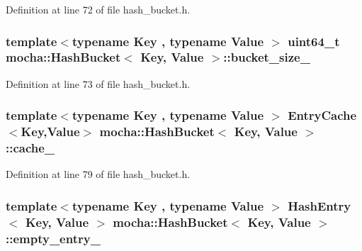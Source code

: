 Definition at line 72 of file hash\_\-bucket.h.

\hypertarget{classmocha_1_1_hash_bucket_add3cde17cfde167c3aeb3f083e39d740}{
\subsubsection[{bucket\_\-size\_\-}]{\setlength{\rightskip}{0pt plus 5cm}template$<$typename Key , typename Value $>$ uint64\_\-t {\bf mocha::HashBucket}$<$ Key, Value $>$::{\bf bucket\_\-size\_\-}}}
\label{classmocha_1_1_hash_bucket_add3cde17cfde167c3aeb3f083e39d740}


Definition at line 73 of file hash\_\-bucket.h.

\hypertarget{classmocha_1_1_hash_bucket_a035c907a461a625b46de064db5ac3677}{
\subsubsection[{cache\_\-}]{\setlength{\rightskip}{0pt plus 5cm}template$<$typename Key , typename Value $>$ {\bf EntryCache}$<$Key,Value$>$ {\bf mocha::HashBucket}$<$ Key, Value $>$::{\bf cache\_\-}}}
\label{classmocha_1_1_hash_bucket_a035c907a461a625b46de064db5ac3677}


Definition at line 79 of file hash\_\-bucket.h.

\hypertarget{classmocha_1_1_hash_bucket_a6c74531aad8a59a84651e953cb6e0872}{
\subsubsection[{empty\_\-entry\_\-}]{\setlength{\rightskip}{0pt plus 5cm}template$<$typename Key , typename Value $>$ {\bf HashEntry}$<$ Key, Value $>$ {\bf mocha::HashBucket}$<$ Key, Value $>$::{\bf empty\_\-entry\_\-}}}
\label{classmocha_1_1_hash_bucket_a6c74531aad8a59a84651e953cb6e0872}


